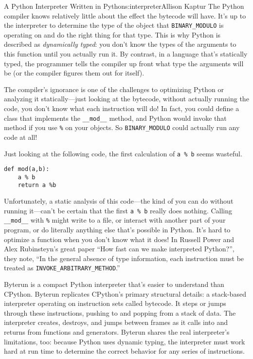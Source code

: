 \begin{aosachapter}{A Python Interpreter Written in Python}{s:interpreter}{Allison Kaptur}
The Python compiler knows relatively little about the effect the
bytecode will have. It's up to the interpreter to determine the type of
the object that \texttt{BINARY\_MODULO} is operating on and do the right
thing for that type. This is why Python is described as
\emph{dynamically typed}: you don't know the types of the arguments to
this function until you actually run it. By contrast, in a language
that's statically typed, the programmer tells the compiler up front what
type the arguments will be (or the compiler figures them out for
itself).

The compiler's ignorance is one of the challenges to optimizing Python
or analyzing it statically---just looking at the bytecode, without
actually running the code, you don't know what each instruction will do!
In fact, you could define a class that implements the
\texttt{\_\_mod\_\_} method, and Python would invoke that method if you
use \texttt{\%} on your objects. So \texttt{BINARY\_MODULO} could
actually run any code at all!

Just looking at the following code, the first calculation of
\texttt{a \% b} seems wasteful.

\begin{verbatim}
def mod(a,b):
    a % b
    return a %b
\end{verbatim}

Unfortunately, a static analysis of this code---the kind of you can do
without running it---can't be certain that the first \texttt{a \% b}
really does nothing. Calling \texttt{\_\_mod\_\_} with \texttt{\%} might
write to a file, or interact with another part of your program, or do
literally anything else that's possible in Python. It's hard to optimize
a function when you don't know what it does! In Russell Power and Alex
Rubinsteyn's great paper ``How fast can we make interpreted Python?'',
they note, ``In the general absence of type information, each
instruction must be treated as \texttt{INVOKE\_ARBITRARY\_METHOD}.''

\label{conclusion}

Byterun is a compact Python interpreter that's easier to understand than
CPython. Byterun replicates CPython's primary structural details: a
stack-based interpreter operating on instruction sets called bytecode.
It steps or jumps through these instructions, pushing to and popping
from a stack of data. The interpreter creates, destroys, and jumps
between frames as it calls into and returns from functions and
generators. Byterun shares the real interpreter's limitations, too:
because Python uses dynamic typing, the interpreter must work hard at
run time to determine the correct behavior for any series of
instructions.


\end{aosachapter}
